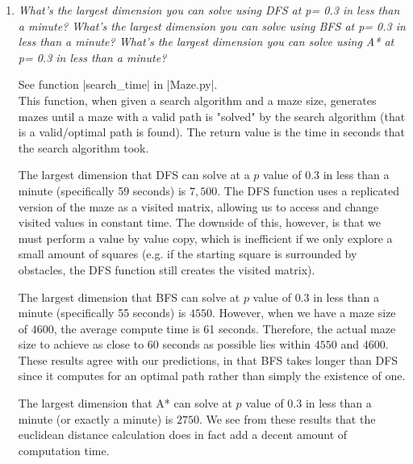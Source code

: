 \documentclass[12pt, twoside]{article}
\begin{document}
\begin{enumerate}
    \item
        \textit{What’s the largest dimension you can solve using DFS at p= 0.3 in less than a minute? What’s  the  largest  dimension  you  can  solve  using  BFS  at p= 0.3 in  less  than  a  minute?  What’s  the largest dimension you can solve using A* at p= 0.3 in less than a minute?}

        \vspace{4mm}
        See function \cverb|search_time| in \cverb|Maze.py|. \\
        This function, when given a search algorithm and a maze size, generates mazes until a maze with a valid path is "solved" by the search algorithm (that is a valid/optimal path is found). The return value is the time in seconds that the search algorithm took.

        \vspace{4mm}
        The largest dimension that DFS can solve at a $p$ value of 0.3 in less than a minute (specifically 59 seconds) is $7,500$. The DFS function uses a replicated version of the maze as a visited matrix, allowing us to access and change visited values in constant time. The downside of this, however, is that we must perform a value by value copy, which is inefficient if we only explore a small amount of squares (e.g. if the starting square is surrounded by obstacles, the DFS function still creates the visited matrix).

        \vspace{4mm}
        The largest dimension that BFS can solve at $p$ value of 0.3 in less than a minute (specifically 55 seconds) is $4550$. However, when we have a maze size of $4600$, the average compute time is 61 seconds. Therefore, the actual maze size to achieve as close to 60 seconds as possible lies within $4550$ and $4600$. These results agree with our predictions, in that BFS takes longer than DFS since it computes for an optimal path rather than simply the existence of one.

        \vspace{4mm}
        The largest dimension that A* can solve at $p$ value of 0.3 in less than a minute (or exactly a minute) is $2750$. We see from these results that the euclidean distance calculation does in fact add a decent amount of computation time. 

\end{enumerate}
\end{document}
